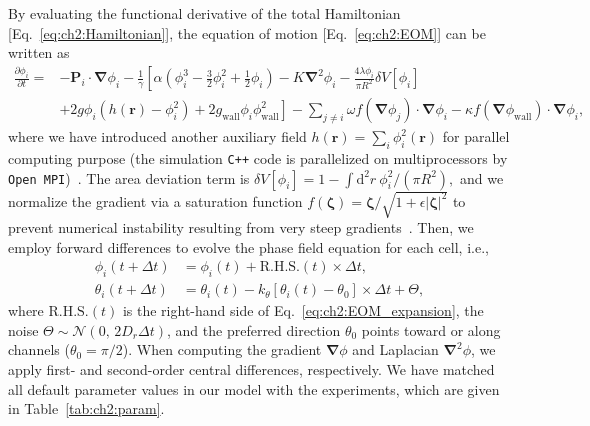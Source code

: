 By evaluating the functional derivative of the total Hamiltonian [Eq.~\eqref{eq:ch2:Hamiltonian}], the equation of motion [Eq.~\eqref{eq:ch2:EOM}] can be written as
\begin{equation}\label{eq:ch2:EOM_expansion}
\begin{split}
    \frac{\partial \phi_i}{\partial t}={}&-\mathbf P_i\cdot\bm{\nabla}\phi_i-\frac{1}{\gamma}\left[\alpha\left(\phi_i^3-\frac{3}{2}\phi_i^2+\frac{1}{2}\phi_i\right)-K\bm{\nabla}^2\phi_i-\frac{4\lambda\phi_i}{\pi R^2}\delta V[\phi_i]\right. \\
    &\left.+2g\phi_i\left(h(\mathbf r)-\phi_i^2\right)+2g_\textrm{wall}\phi_i \phi_\textrm{wall}^2\right]-\sum_{j\neq i}\omega f(\bm{\nabla}\phi_j)\cdot\bm{\nabla}\phi_i-\kappa f(\bm{\nabla}\phi_\textrm{wall})\cdot\bm{\nabla}\phi_i,
\end{split}
\end{equation}
where we have introduced another auxiliary field $h(\mathbf r)=\sum_i\phi_i^2(\mathbf r)$ for parallel computing purpose (the simulation \texttt{C++} code is parallelized on multiprocessors by \texttt{Open MPI})~\cite{loewe2020solid}.
The area deviation term is $\delta V[\phi_i]=1-\int\mathrm{d}^2 r~{\phi_i^2}/{(\pi R^2)},$ and we normalize the gradient via a saturation function $f(\bm{\zeta})=\bm{\zeta}/\sqrt{1+\epsilon|\bm{\zeta}|^2}$ to prevent numerical instability resulting from very steep gradients~\cite{lober2015collisions}.
Then, we employ forward differences to evolve the phase field equation for each cell, i.e.,
\begin{subequations}
\begin{align}
    \phi_i(t+\Delta t)&=\phi_i(t)+\textrm{R.H.S.}(t)\times\Delta t, \\
    \theta_i(t+\Delta t)&=\theta_i(t) -k_\theta[\theta_i(t)-\theta_0]\times \Delta t + \Theta,
\end{align}
\end{subequations}
where $\textrm{R.H.S.}(t)$ is the right-hand side of Eq.~\eqref{eq:ch2:EOM_expansion}, the noise $\Theta\sim \mathcal{N}(0,\,2D_r\Delta t)$, and the preferred direction $\theta_0$ points toward or along channels ($\theta_0=\pi/2$).
When computing the gradient $\bm{\nabla}\phi$ and Laplacian $\bm{\nabla}^2\phi$, we apply first- and second-order central differences, respectively.
We have matched all default parameter values in our model with the experiments, which are given in Table~\ref{tab:ch2:param}.

